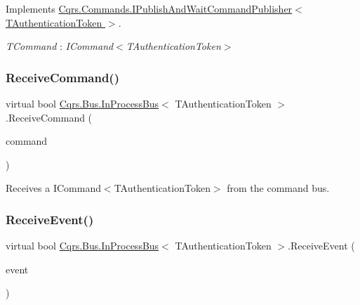 Implements \hyperlink{interfaceCqrs_1_1Commands_1_1IPublishAndWaitCommandPublisher_a0460fc2091d52ba3463973fea5028bc6}{Cqrs.\+Commands.\+I\+Publish\+And\+Wait\+Command\+Publisher$<$ T\+Authentication\+Token $>$}.

\begin{Desc}
\item[Type Constraints]\begin{description}
\item[{\em T\+Command} : {\em I\+Command$<$T\+Authentication\+Token$>$}]\end{description}
\end{Desc}
\mbox{\label{classCqrs_1_1Bus_1_1InProcessBus_afa5b4def79709baa28fbd15c215a4111}} 
\subsubsection{\texorpdfstring{Receive\+Command()}{ReceiveCommand()}}
{\footnotesize\ttfamily virtual bool \hyperlink{classCqrs_1_1Bus_1_1InProcessBus}{Cqrs.\+Bus.\+In\+Process\+Bus}$<$ T\+Authentication\+Token $>$.Receive\+Command (\begin{DoxyParamCaption}\item[{\hyperlink{interfaceCqrs_1_1Commands_1_1ICommand}{I\+Command}$<$ T\+Authentication\+Token $>$}]{command }\end{DoxyParamCaption})\hspace{0.3cm}{\ttfamily [virtual]}}



Receives a I\+Command$<$\+T\+Authentication\+Token$>$ from the command bus. 

\mbox{\label{classCqrs_1_1Bus_1_1InProcessBus_aab52f8518371f5ff5e3f193b1234f192}} 
\subsubsection{\texorpdfstring{Receive\+Event()}{ReceiveEvent()}}
{\footnotesize\ttfamily virtual bool \hyperlink{classCqrs_1_1Bus_1_1InProcessBus}{Cqrs.\+Bus.\+In\+Process\+Bus}$<$ T\+Authentication\+Token $>$.Receive\+Event (\begin{DoxyParamCaption}\item[{\hyperlink{interfaceCqrs_1_1Events_1_1IEvent}{I\+Event}$<$ T\+Authentication\+Token $>$ @}]{event }\end{DoxyParamCaption})\hspace{0.3cm}{\ttfamily [virtual]}}



